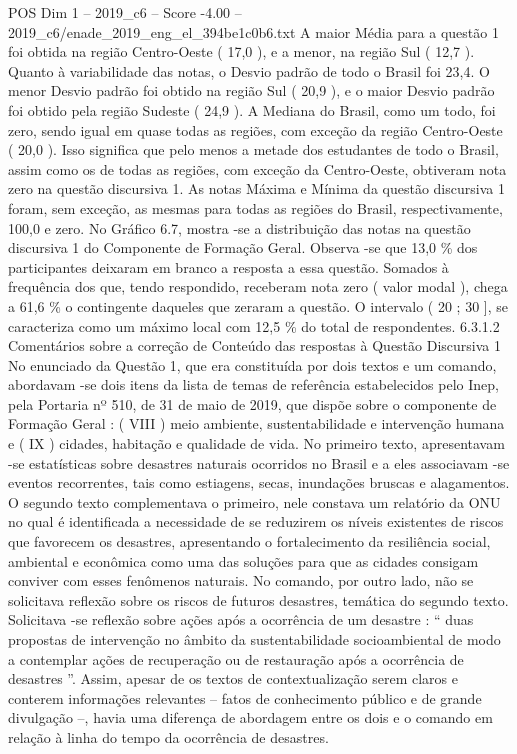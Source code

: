 \begin{textsample}{POS Dim 1 – 2019\_c6 – Score -4.00 – 2019\_c6/enade\_2019\_eng\_el\_394be1c0b6.txt}
A maior Média para a questão 1 foi obtida na região Centro-Oeste ( 17,0 ), e a menor, na região Sul ( 12,7 ).
Quanto à variabilidade das notas, o Desvio padrão de todo o Brasil foi 23,4.
O menor Desvio padrão foi obtido na região Sul ( 20,9 ), e o maior Desvio padrão foi obtido pela região Sudeste ( 24,9 ).
A Mediana do Brasil, como um todo, foi zero, sendo igual em quase todas as regiões, com exceção da região Centro-Oeste ( 20,0 ).
Isso significa que pelo menos a metade dos estudantes de todo o Brasil, assim como os de todas as regiões, com exceção da Centro-Oeste, obtiveram nota zero na questão discursiva 1.
As notas Máxima e Mínima da questão discursiva 1 foram, sem exceção, as mesmas para todas as regiões do Brasil, respectivamente, 100,0 e zero.
No Gráfico 6.7, mostra -se a distribuição das notas na questão discursiva 1 do Componente de Formação Geral.
Observa -se que 13,0 \% dos participantes deixaram em branco a resposta a essa questão.
Somados à frequência dos que, tendo respondido, receberam nota zero ( valor modal ), chega a 61,6 \% o contingente daqueles que zeraram a questão.
O intervalo ( 20 ; 30 ], se caracteriza como um máximo local com 12,5 \% do total de respondentes. 6.3.1.2 Comentários sobre a correção de Conteúdo das respostas à Questão Discursiva 1 No enunciado da Questão 1, que era constituída por dois textos e um comando, abordavam -se dois itens da lista de temas de referência estabelecidos pelo Inep, pela Portaria nº 510, de 31 de maio de 2019, que dispõe sobre o componente de Formação Geral : ( VIII ) meio ambiente, sustentabilidade e intervenção humana e ( IX ) cidades, habitação e qualidade de vida.
No primeiro texto, apresentavam -se estatísticas sobre desastres naturais ocorridos no Brasil e a eles associavam -se eventos recorrentes, tais como estiagens, secas, inundações bruscas e alagamentos.
O segundo texto complementava o primeiro, nele constava um relatório da ONU no qual é identificada a necessidade de se reduzirem os níveis existentes de riscos que favorecem os desastres, apresentando o fortalecimento da resiliência social, ambiental e econômica como uma das soluções para que as cidades consigam conviver com esses fenômenos naturais.
No comando, por outro lado, não se solicitava reflexão sobre os riscos de futuros desastres, temática do segundo texto.
Solicitava -se reflexão sobre ações após a ocorrência de um desastre : “ duas propostas de intervenção no âmbito da sustentabilidade socioambiental de modo a contemplar ações de recuperação ou de restauração após a ocorrência de desastres ”.
Assim, apesar de os textos de contextualização serem claros e conterem informações relevantes – fatos de conhecimento público e de grande divulgação –, havia uma diferença de abordagem entre os dois e o comando em relação à linha do tempo da ocorrência de desastres.

\end{textsample}
